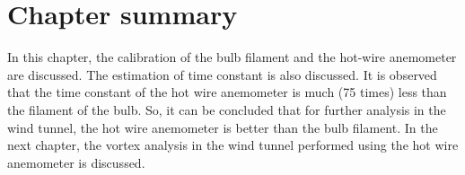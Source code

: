\section{Chapter summary}

In this chapter, the calibration of the bulb filament and the hot-wire anemometer are discussed. The estimation of time constant is also discussed. It is observed that the time constant of the hot wire anemometer is much (75 times) less than the filament of the bulb. So, it can be concluded that for further analysis in the wind tunnel, the hot wire anemometer is better than the bulb filament. In the next chapter, the vortex analysis in the wind tunnel performed using the hot wire anemometer is discussed.